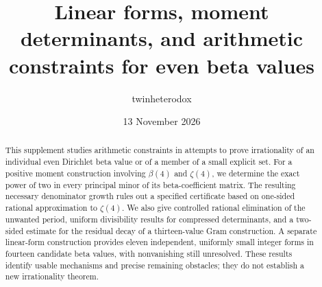 \documentclass[11pt]{article}
\title{Linear forms, moment determinants, and arithmetic constraints for even beta values}
\author{twinheterodox}
\date{13 November 2026}
\theoremstyle{remark}\newtheorem{remark}[theorem]{Remark}
\numberwithin{equation}{section}
\begin{document}
\maketitle
\begin{abstract}
This supplement studies arithmetic constraints in attempts to prove
irrationality of an individual even Dirichlet beta value or of a member
of a small explicit set. For a positive moment construction involving
$\beta(4)$ and $\zeta(4)$, we determine the exact power of two in every
principal minor of its beta-coefficient matrix. The resulting necessary
denominator growth rules out a specified certificate based on one-sided
rational approximation to $\zeta(4)$. We also give controlled rational
elimination of the unwanted period, uniform divisibility results for
compressed determinants, and a two-sided estimate for the residual decay
of a thirteen-value Gram construction. A separate linear-form construction
provides eleven independent, uniformly small integer forms in fourteen
candidate beta values, with nonvanishing still unresolved. These results
identify usable mechanisms and precise remaining obstacles; they do not
establish a new irrationality theorem.
\end{abstract}
\setcounter{tocdepth}{1}
\begingroup\small
\tableofcontents
\endgroup
\clearpage









\appendix


\end{document}
